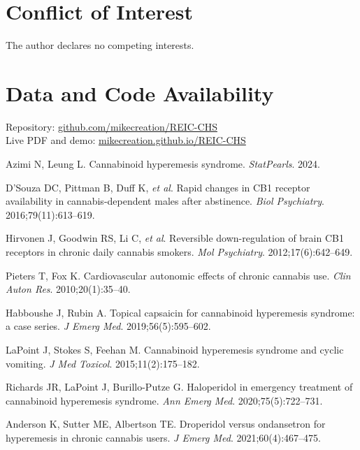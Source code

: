 \documentclass[11pt]{article}
\begin{document}
\section*{Conflict of Interest}
The author declares no competing interests.

\section*{Data and Code Availability}
Repository: \href{https://github.com/mikecreation/REIC-CHS}{github.com/mikecreation/REIC-CHS}\\
Live PDF and demo: \href{https://mikecreation.github.io/REIC-CHS/}{mikecreation.github.io/REIC-CHS}


\begin{thebibliography}{99}

Azimi N, Leung L.
Cannabinoid hyperemesis syndrome.
\textit{StatPearls}. 2024.

D'Souza DC, Pittman B, Duff K, \textit{et al}.
Rapid changes in CB1 receptor availability in cannabis-dependent males after abstinence.
\textit{Biol Psychiatry}. 2016;79(11):613–619.

Hirvonen J, Goodwin RS, Li C, \textit{et al}.
Reversible down-regulation of brain CB1 receptors in chronic daily cannabis smokers.
\textit{Mol Psychiatry}. 2012;17(6):642–649.

Pieters T, Fox K.
Cardiovascular autonomic effects of chronic cannabis use.
\textit{Clin Auton Res}. 2010;20(1):35–40.

Habboushe J, Rubin A.
Topical capsaicin for cannabinoid hyperemesis syndrome: a case series.
\textit{J Emerg Med}. 2019;56(5):595–602.

LaPoint J, Stokes S, Feehan M.
Cannabinoid hyperemesis syndrome and cyclic vomiting.
\textit{J Med Toxicol}. 2015;11(2):175–182.

Richards JR, LaPoint J, Burillo-Putze G.
Haloperidol in emergency treatment of cannabinoid hyperemesis syndrome.
\textit{Ann Emerg Med}. 2020;75(5):722–731.

Anderson K, Sutter ME, Albertson TE.
Droperidol versus ondansetron for hyperemesis in chronic cannabis users.
\textit{J Emerg Med}. 2021;60(4):467–475.

\end{thebibliography}
\end{document}
